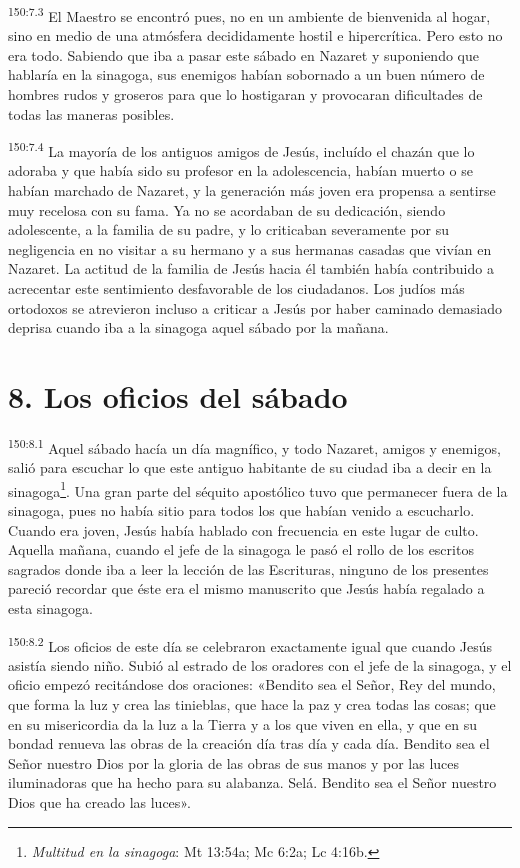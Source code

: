 \par
\textsuperscript{150:7.3} El Maestro se encontró pues, no en un ambiente de bienvenida al hogar, sino en medio de una atmósfera decididamente hostil e hipercrítica. Pero esto no era todo. Sabiendo que iba a pasar este sábado en Nazaret y suponiendo que hablaría en la sinagoga, sus enemigos habían sobornado a un buen número de hombres rudos y groseros para que lo hostigaran y provocaran dificultades de todas las maneras posibles.

\par
\textsuperscript{150:7.4} La mayoría de los antiguos amigos de Jesús, incluído el chazán que lo adoraba y que había sido su profesor en la adolescencia, habían muerto o se habían marchado de Nazaret, y la generación más joven era propensa a sentirse muy recelosa con su fama. Ya no se acordaban de su dedicación, siendo adolescente, a la familia de su padre, y lo criticaban severamente por su negligencia en no visitar a su hermano y a sus hermanas casadas que vivían en Nazaret. La actitud de la familia de Jesús hacia él también había contribuido a acrecentar este sentimiento desfavorable de los ciudadanos. Los judíos más ortodoxos se atrevieron incluso a criticar a Jesús por haber caminado demasiado deprisa cuando iba a la sinagoga aquel sábado por la mañana.

\section*{8. Los oficios del sábado}
\par
\textsuperscript{150:8.1} Aquel sábado hacía un día magnífico, y todo Nazaret, amigos y enemigos, salió para escuchar lo que este antiguo habitante de su ciudad iba a decir en la sinagoga\footnote{\textit{Multitud en la sinagoga}: Mt 13:54a; Mc 6:2a; Lc 4:16b.}. Una gran parte del séquito apostólico tuvo que permanecer fuera de la sinagoga, pues no había sitio para todos los que habían venido a escucharlo. Cuando era joven, Jesús había hablado con frecuencia en este lugar de culto. Aquella mañana, cuando el jefe de la sinagoga le pasó el rollo de los escritos sagrados donde iba a leer la lección de las Escrituras, ninguno de los presentes pareció recordar que éste era el mismo manuscrito que Jesús había regalado a esta sinagoga.

\par
\textsuperscript{150:8.2} Los oficios de este día se celebraron exactamente igual que cuando Jesús asistía siendo niño. Subió al estrado de los oradores con el jefe de la sinagoga, y el oficio empezó recitándose dos oraciones: «Bendito sea el Señor, Rey del mundo, que forma la luz y crea las tinieblas, que hace la paz y crea todas las cosas; que en su misericordia da la luz a la Tierra y a los que viven en ella, y que en su bondad renueva las obras de la creación día tras día y cada día. Bendito sea el Señor nuestro Dios por la gloria de las obras de sus manos y por las luces iluminadoras que ha hecho para su alabanza. Selá. Bendito sea el Señor nuestro Dios que ha creado las luces».

